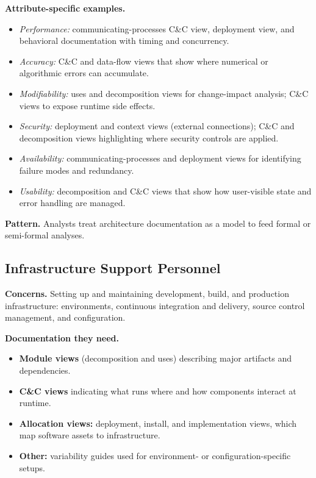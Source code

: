 \documentclass[11pt]{article}
\begin{document}
\noindent
\textbf{Attribute-specific examples.}
\begin{itemize}[noitemsep]
  \item \emph{Performance:} communicating-processes C\&C view, deployment view, and behavioral documentation with timing and concurrency.
  \item \emph{Accuracy:} C\&C and data-flow views that show where numerical or algorithmic errors can accumulate.
  \item \emph{Modifiability:} uses and decomposition views for change-impact analysis; C\&C views to expose runtime side effects.
  \item \emph{Security:} deployment and context views (external connections); C\&C and decomposition views highlighting where security controls are applied.
  \item \emph{Availability:} communicating-processes and deployment views for identifying failure modes and redundancy.
  \item \emph{Usability:} decomposition and C\&C views that show how user-visible state and error handling are managed.
\end{itemize}

\noindent
\textbf{Pattern.} Analysts treat architecture documentation as a model to feed formal or semi-formal analyses.

\subsection{Infrastructure Support Personnel}

\textbf{Concerns.} Setting up and maintaining development, build, and production infrastructure: environments, continuous integration and delivery, source control management, and configuration.

\medskip
\noindent
\textbf{Documentation they need.}
\begin{itemize}[noitemsep]
  \item \textbf{Module views} (decomposition and uses) describing major artifacts and dependencies.
  \item \textbf{C\&C views} indicating what runs where and how components interact at runtime.
  \item \textbf{Allocation views:} deployment, install, and implementation views, which map software assets to infrastructure.
  \item \textbf{Other:} variability guides used for environment- or configuration-specific setups.
\end{itemize}
\end{document}
